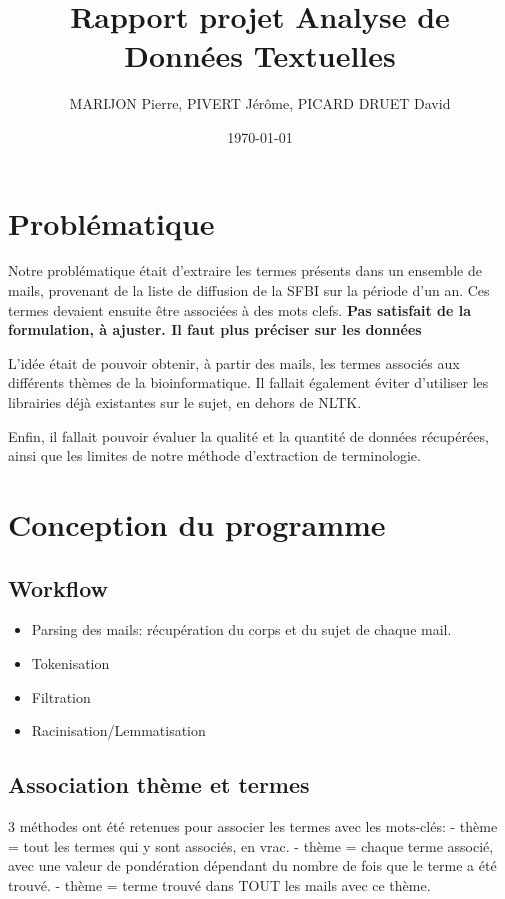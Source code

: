 \documentclass[11pt,a4paper]{article}
\author{MARIJON Pierre, PIVERT Jérôme, PICARD DRUET David}
\title{Rapport projet Analyse de Données Textuelles}
\date{\today}
\begin{document}
\maketitle

\section*{Problématique}
Notre problématique était d'extraire les termes présents dans un ensemble de mails, provenant de la liste de diffusion de la SFBI sur la période d'un an. Ces termes devaient ensuite être associées à des mots clefs. \textbf{Pas satisfait de la formulation, à ajuster. Il faut plus préciser sur les données}

L'idée était de pouvoir obtenir, à partir des mails, les termes associés aux différents thèmes de la bioinformatique. Il fallait également éviter d'utiliser les librairies déjà existantes sur le sujet, en dehors de NLTK.

Enfin, il fallait pouvoir évaluer la qualité et la quantité de données récupérées, ainsi que les limites de notre méthode d'extraction de terminologie.


\section*{Conception du programme}
\subsection*{Workflow}
\begin{itemize}
    \item Parsing des mails: récupération du corps et du sujet de chaque mail.
    \item Tokenisation
    \item Filtration
    \item Racinisation/Lemmatisation
\end{itemize}

\subsection*{Association thème et termes}
3 méthodes ont été retenues pour associer les termes avec les mots-clés:
- thème = tout les termes qui y sont associés, en vrac.
- thème = chaque terme associé, avec une valeur de pondération dépendant du nombre de fois que le terme a été trouvé.
- thème = terme trouvé dans TOUT les mails avec ce thème.
\end{document}
